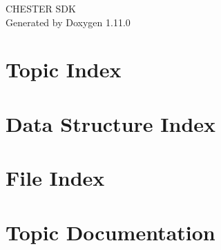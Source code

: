 \documentclass[twoside]{book}
\newcommand{\+}{\discretionary{\mbox{\scriptsize$\hookleftarrow$}}{}{}}
\newcommand{\clearemptydoublepage}{%
    \newpage{\pagestyle{empty}\cleardoublepage}%
  }
\begin{document}
  \raggedbottom
    \hypersetup{pageanchor=false,
                bookmarksnumbered=true,
                pdfencoding=unicode
               }
  \begin{titlepage}
  \vspace*{7cm}
  \begin{center}%
  {\Large CHESTER SDK}\\
  \vspace*{1cm}
  {\large Generated by Doxygen 1.11.0}\\
  \end{center}
  \end{titlepage}
  \clearemptydoublepage
  \tableofcontents
  \clearemptydoublepage
  \hypersetup{pageanchor=true}
\chapter{Topic Index}

\chapter{Data Structure Index}

\chapter{File Index}

\chapter{Topic Documentation}














































\end{document}
